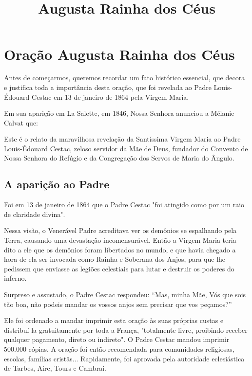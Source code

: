 \documentclass[a4paper,14pt]{extarticle} \usepackage[utf8]{inputenc}
\begin{document}
\title{\textbf{Augusta Rainha dos Céus}}
\date{}
\maketitle

\section{Oração Augusta Rainha dos Céus}

Antes de começarmos, queremos recordar um fato histórico essencial, que decora e justifica toda a importância desta oração, que foi revelada ao Padre Louis-Édouard Cestac em 13 de janeiro de 1864 pela Virgem Maria.

Em sua aparição em La Salette, em 1846, Nossa Senhora anunciou a Mélanie Calvat que:  

Este é o relato da maravilhosa revelação da Santíssima Virgem Maria ao Padre Louis-Édouard Cestac, zeloso servidor da Mãe de Deus, fundador do Convento de Nossa Senhora do Refúgio e da Congregação dos Servos de Maria do Ângulo.

\subsection{A aparição ao Padre}

Foi em 13 de janeiro de 1864 que o Padre Cestac "foi atingido como por um raio de claridade divina".  

Nessa visão, o Venerável Padre acreditava ver os demônios se espalhando pela Terra, causando uma devastação incomensurável.  
Então a Virgem Maria teria dito a ele que os demônios foram libertados no mundo, e que havia chegado a hora de ela ser invocada como Rainha e Soberana dos Anjos, para que lhe pedissem que enviasse as legiões celestiais para lutar e destruir os poderes do inferno.

Surpreso e assustado, o Padre Cestac respondeu:  
“Mas, minha Mãe, Vós que sois tão boa, não podeis mandar os vossos anjos sem precisar que vos peçamos?”

Ele foi ordenado a mandar imprimir esta oração às suas próprias custas e distribuí-la gratuitamente por toda a França, "totalmente livre, proibindo receber qualquer pagamento, direto ou indireto".  
O Padre Cestac mandou imprimir 500.000 cópias.  
A oração foi então recomendada para comunidades religiosas, escolas, famílias cristãs... Rapidamente, foi aprovada pela autoridade eclesiástica de Tarbes, Aire, Tours e Cambrai.
\end{document}
